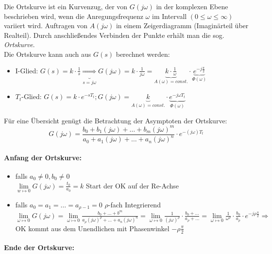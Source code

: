 \message{ !name(Mitschrieb_SysRegel.tex)}\documentclass[12pt,a4paper,ngerman]{scrartcl}
\begin{document}
Die Ortskurve ist ein Kurvenzug, der von $G(j\omega)$ in der komplexen Ebene beschrieben wird, wenn die Anregungsfrequenz $\omega$ im Intervall $(0\leq \omega \leq \infty)$ variiert wird.
Auftragen von $A(j\omega)$ in einem Zeigerdiagramm (Imaginärteil über Realteil). Durch anschließendes Verbinden der Punkte erhält man die sog. \emph{Ortskurve}.\\
Die Ortskurve kann auch aus $G(s)$ berechnet werden:
\begin{itemize}
\item I-Glied: $G(s)=k\cdot \frac{1}{s} \underbrace{\Rightarrow}_{s=j\omega}G(j\omega)=k\cdot \frac{1}{j\omega}=\underbrace{k\cdot \frac{1}{\omega}}_{A(\omega)=const.}\cdot \underbrace{e^{-j\frac{\pi}{2}}}_{\Phi(\omega)}$
\item $T_t$-Glied: $G(s)=k\cdot e^{-sT_t}; G(j\omega)=\underbrace{k}_{A(\omega)=const.}\cdot \underbrace{e^{-j\omega T_t}}_{\Phi(\omega)}$
\end{itemize}
Für eine Übersicht genügt die Betrachtung der Asymptoten der Ortskurve:
\[
G(j\omega)=\frac{b_0+b_1(j\omega)+\dots+b_m(j\omega)^m}{a_0+a_1(j\omega)+\dots+a_n(j\omega)^n}\cdot e^{-(j\omega)T_t}
\]

\paragraph{Anfang der Ortskurve:}

\begin{itemize}
\item falls $a_0 \neq 0, b_0 \neq 0$\\
  $\lim\limits_{w\mapsto 0}{G(j\omega)=\frac{t_0}{a_0}=k}$ Start der OK auf der Re-Achse
\item falls $a_0=a_1=\dots=a_{\rho -1}=0$ $\rho$-fach Integrierend\\
$\lim\limits_{\omega \mapsto 0}{G(j\omega)}= \lim\limits_{\omega \mapsto 0}{\frac{b_0+\dots+b^m}{a_\rho(j\omega)^\rho+\dots+a_n(j\omega)^n}}=\lim\limits_{\omega \mapsto 0} {\frac{1}{(j\omega)^\rho} \cdot \frac{b_0+\dots}{a_\rho+\dots}}=\lim\limits_{\omega \mapsto 0}{\frac{1}{\omega^\rho}\cdot \frac{b_0}{a_\rho}\cdot e^{-j\rho\frac{\pi}{2}}} \Rightarrow$ OK kommt aus dem Unendlichen mit Phasenwinkel $-\rho \frac{\pi}{2}$
\end{itemize}

\paragraph{Ende der Ortskurve:}
\end{document}
